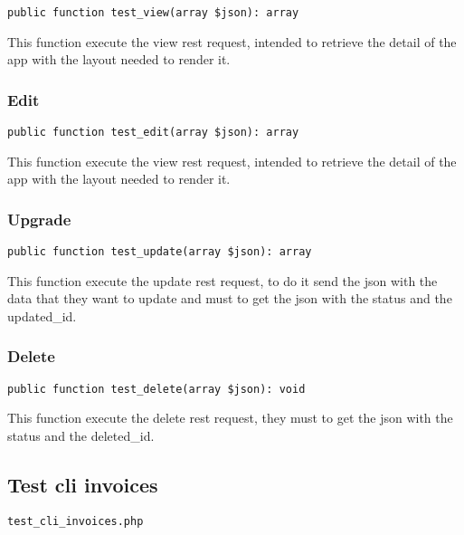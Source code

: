 \documentclass[a4paper]{article}
\begin{document}
\begin{lstlisting}
public function test_view(array $json): array
\end{lstlisting}

This function execute the view rest request, intended to retrieve the detail
of the app with the layout needed to render it.

\hypertarget{toc17}{}
\subsubsection{Edit}

\begin{lstlisting}
public function test_edit(array $json): array
\end{lstlisting}

This function execute the view rest request, intended to retrieve the detail
of the app with the layout needed to render it.

\hypertarget{toc18}{}
\subsubsection{Upgrade}

\begin{lstlisting}
public function test_update(array $json): array
\end{lstlisting}

This function execute the update rest request, to do it send the json with
the data that they want to update and must to get the json with the status
and the updated\_id.

\hypertarget{toc19}{}
\subsubsection{Delete}

\begin{lstlisting}
public function test_delete(array $json): void
\end{lstlisting}

This function execute the delete rest request, they must to get the json
with the status and the deleted\_id.

\hypertarget{toc20}{}
\subsection{Test cli invoices}

\begin{lstlisting}
test_cli_invoices.php
\end{lstlisting}
\end{document}
